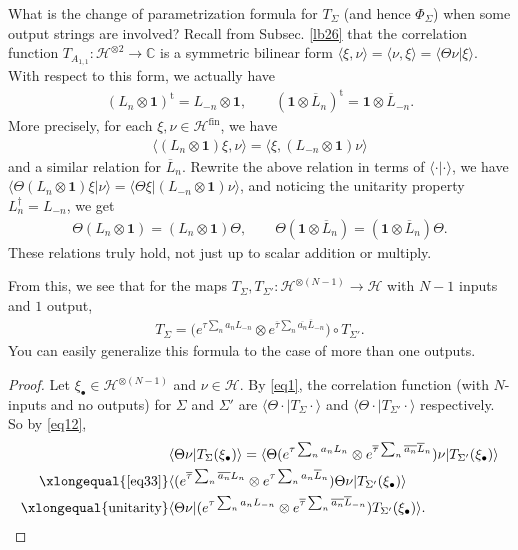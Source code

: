\documentclass[11pt,b5paper,notitlepage]{article}
\theoremstyle{definition}
\theoremstyle{plain}
\newcommand{\mc}{\mathcal}
\newcommand{\ovl}{\overline}
\newcommand{\tr}{\mathrm{t}} %
\newcommand{\id}{\mathbf{1}}
\newcommand{\bk}[1]{\langle {#1}\rangle}
\newcommand{\blt}{\bullet}
\newcommand{\Cbb}{\mathbb C}
\newcommand{\fin}{\mathrm{fin}}
\numberwithin{equation}{section}
\begin{document}
What is the change of parametrization formula for $T_\Sigma$ (and hence $\Phi_\Sigma$) when some output strings are involved? Recall from Subsec. \ref{lb26} that the correlation function $T_{A_{1,1}}:\mc H^{\otimes 2}\rightarrow\Cbb$ is a symmetric bilinear form $\bk{\xi,\nu}=\bk{\nu,\xi}=\bk{\Theta\nu|\xi}$. With respect to this form, we actually have
\begin{align}
(L_n\otimes\id)^\tr=L_{-n}\otimes\id,\qquad (\id\otimes\ovl L_n)^\tr=\id\otimes \ovl L_{-n}.	\label{eq15}
\end{align}
More precisely, for each $\xi,\nu\in\mc H^\fin$, we have
\begin{align*}
\bk{(L_n\otimes\id)\xi,\nu}=\bk{\xi,(L_{-n}\otimes\id)\nu}	
\end{align*} 
and a similar relation for $\ovl L_n$. Rewrite the above relation in terms of $\bk{\cdot|\cdot}$, we have $\bk{\Theta(L_n\otimes\id)\xi|\nu}=\bk{\Theta\xi|(L_{-n}\otimes\id)\nu}	$, and noticing the unitarity property $L_n^\dagger=L_{-n}$, we get
\begin{align}
\Theta(L_n\otimes\id)=(L_n\otimes\id)\Theta,\qquad \Theta(\id\otimes\ovl L_n)=(\id\otimes\ovl L_n)\Theta.\label{eq33}
\end{align}
These relations truly hold, not just up to scalar addition or multiply.

From this, we see that for the maps $T_\Sigma,T_{\Sigma'}:\mc H^{\otimes(N-1)}\rightarrow\mc H$ with $N-1$ inputs and $1$ output,
\begin{align}
T_\Sigma=\Big(e^{\tau\sum_n a_nL_{-n}}\otimes e^{\ovl \tau\sum_n \ovl{a_n}\ovl L_{-n}}\Big)\circ T_{\Sigma'}.	\label{eq13}
\end{align}
You can easily generalize this formula to the case of more than one outputs.
\begin{proof}
Let $\xi_\blt\in\mc H^{\otimes(N-1)}$ and $\nu\in\mc H$. By \eqref{eq1}, the correlation function (with $N$-inputs and no outputs) for $\Sigma$ and $\Sigma'$ are $\bk{\Theta\cdot|T_\Sigma\cdot}$ and $\bk{\Theta\cdot|T_{\Sigma'}\cdot}$ respectively. So by  \eqref{eq12}, 
\begin{align*}
&\bk{\Theta\nu|T_\Sigma(\xi_\blt)}=\bk{\Theta (e^{\tau\sum_n a_nL_n}\otimes e^{\ovl \tau\sum_n \ovl{a_n}\ovl L_n})\nu|T_{\Sigma'}(\xi_\blt)}\\
\xlongequal{\eqref{eq33}}&	\bk{(e^{\ovl \tau\sum_n \ovl{a_n}L_n}\otimes e^{\tau\sum_n a_n\ovl L_n})\Theta \nu|T_{\Sigma'}(\xi_\blt)}\\
\xlongequal{\text{unitarity}}&\bk{\Theta \nu|(e^{\tau\sum_n a_nL_{-n}}\otimes e^{\ovl \tau\sum_n \ovl{a_n}\ovl L_{-n}})T_{\Sigma'}(\xi_\blt)}.
\end{align*}
\end{proof}
\end{document}
